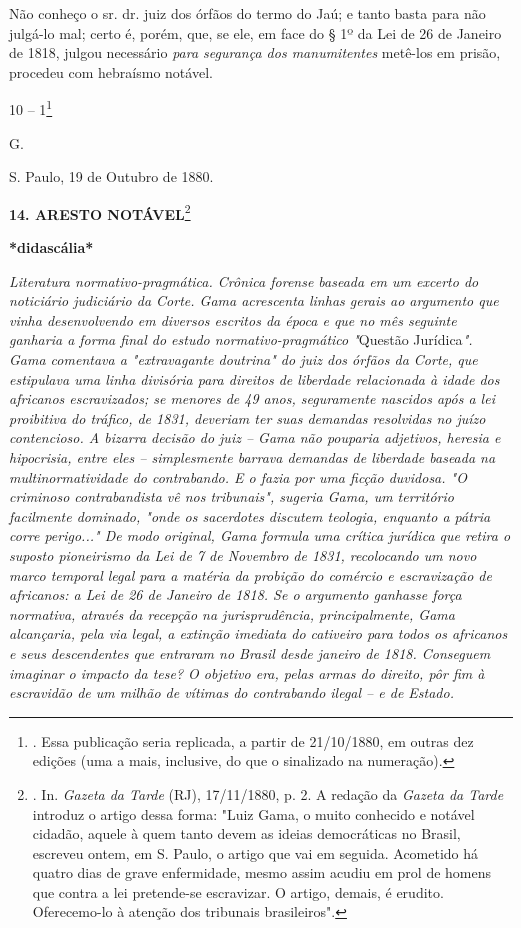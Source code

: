 Não conheço o sr. dr. juiz dos órfãos do termo do Jaú; e tanto basta
para não julgá-lo mal; certo é, porém, que, se ele, em face do § 1º da
Lei de 26 de Janeiro de 1818, julgou necessário \emph{para segurança dos
manumitentes} metê-los em prisão, procedeu com hebraísmo notável.

10 -- 1\footnote{. Essa publicação seria replicada, a partir de
  21/10/1880, em outras dez edições (uma a mais, inclusive, do que o
  sinalizado na numeração).}

G.

S. Paulo, 19 de Outubro de 1880.

\textbf{14. ARESTO NOTÁVEL}\footnote{. In. \emph{Gazeta da Tarde} (RJ),
  17/11/1880, p. 2. A redação da \emph{Gazeta da Tarde} introduz o
  artigo dessa forma: "Luiz Gama, o muito conhecido e notável cidadão,
  aquele à quem tanto devem as ideias democráticas no Brasil, escreveu
  ontem, em S. Paulo, o artigo que vai em seguida. Acometido há quatro
  dias de grave enfermidade, mesmo assim acudiu em prol de homens que
  contra a lei pretende-se escravizar. O artigo, demais, é erudito.
  Oferecemo-lo à atenção dos tribunais brasileiros".}

\textbf{*didascália*}

\emph{Literatura normativo-pragmática. Crônica forense baseada em um
excerto do noticiário judiciário da Corte. Gama acrescenta linhas gerais
ao argumento que vinha desenvolvendo em diversos escritos da época e que
no mês seguinte ganharia a forma final do estudo normativo-pragmático
"}Questão Jurídica\emph{". Gama comentava a "extravagante doutrina" do
juiz dos órfãos da Corte, que estipulava uma linha divisória para
direitos de liberdade relacionada à idade dos africanos escravizados; se
menores de 49 anos, seguramente nascidos após a lei proibitiva do
tráfico, de 1831, deveriam ter suas demandas resolvidas no juízo
contencioso. A bizarra decisão do juiz -- Gama não pouparia adjetivos,
heresia e hipocrisia, entre eles -- simplesmente barrava demandas de
liberdade baseada na multinormatividade do contrabando. E o fazia por
uma ficção duvidosa. "O criminoso contrabandista vê nos tribunais",
sugeria Gama, um território facilmente dominado, "onde os sacerdotes
discutem teologia, enquanto a pátria corre perigo..." De modo original,
Gama formula uma crítica jurídica que retira o suposto pioneirismo da
Lei de 7 de Novembro de 1831, recolocando um novo marco temporal legal
para a matéria da probição do comércio e escravização de africanos: a
Lei de 26 de Janeiro de 1818. Se o argumento ganhasse força normativa,
através da recepção na jurisprudência, principalmente, Gama alcançaria,
pela via legal, a extinção imediata do cativeiro para todos os africanos
e seus descendentes que entraram no Brasil desde janeiro de 1818.
Conseguem imaginar o impacto da tese? O objetivo era, pelas armas do
direito, pôr fim à escravidão de um milhão de vítimas do contrabando
ilegal -- e de Estado. }

